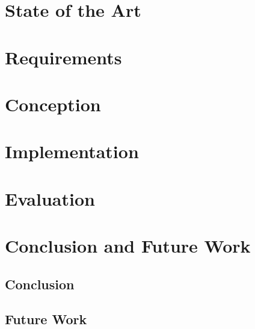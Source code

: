 \documentclass[english, BCOR=6mm, twoside=true, open=right]{tudscrreprt}
\begin{document}
\chapter{State of the Art}\label{chapter:state-of-the-art}



\chapter{Requirements}\label{sec:aims}


\chapter{Conception}




\chapter{Implementation}



\chapter{Evaluation}



\chapter{Conclusion and Future Work}
\section{Conclusion}
\section{Future Work}


\newpage
{}
\listoffigures

\newpage
{}
\listoftables

\newpage
{}
\lstlistoflistings

\newpage
{}
\printglossary
\end{document}
